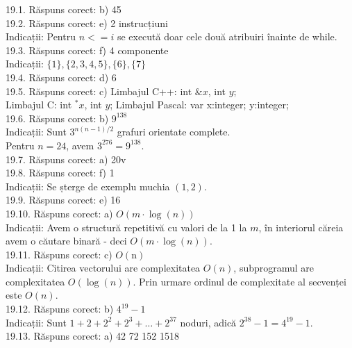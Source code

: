19.1. Răspuns corect: b) 45\\

19.2. Răspuns corect: e) 2 instrucțiuni\\
Indicații: Pentru $n<=i$ se execută doar cele două atribuiri înainte de while.\\

19.3. Răspuns corect: f) 4 componente\\
Indicații: $\{1\},\{2,3,4,5\},\{6\},\{7\}$\\

19.4. Răspuns corect: d) 6\\

19.5. Răspuns corect: c) Limbajul C++: int $\& x$, int $y$;\\ Limbajul C: int $^{*}x$, int $y$; Limbajul Pascal: var x:integer; y:integer;\\

19.6. Răspuns corect: b) $9^{138}$\\
Indicații: Sunt $3^{n(n-1) / 2}$ grafuri orientate complete.\\ Pentru $n=24$, avem $3^{276}=9^{138}$.\\

19.7. Răspuns corect: a) 20v\\

19.8. Răspuns corect: f) 1\\
Indicații: Se șterge de exemplu muchia $(1,2)$.\\

19.9. Răspuns corect: e) 16\\

19.10. Răspuns corect: a) $O(m \cdot \log (n))$\\
Indicații: Avem o structură repetitivă cu valori de la 1 la $m$, în interiorul căreia avem o căutare binară - deci $O(m \cdot \log (n))$.\\

19.11. Răspuns corect: c) $O(\mathrm{n})$\\
Indicații: Citirea vectorului are complexitatea $O(n)$, subprogramul are complexitatea $O(\log (n))$. Prin urmare ordinul de complexitate al secvenței este $O(n)$.\\

19.12. Răspuns corect: b) $4^{19}-1$\\
Indicații: Sunt $1+2+2^{2}+2^{3}+\ldots+2^{37}$ noduri, adică $2^{38}-1=4^{19}-1$.\\

19.13. Răspuns corect: a) 42 72 152 1518\\

